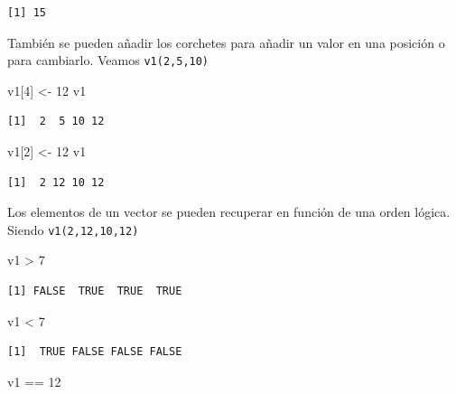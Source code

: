 \documentclass[
  letterpaper,
  DIV=11,
  numbers=noendperiod]{scrreprt}
\newenvironment{Shaded}{\begin{snugshade}}{\end{snugshade}}
\newcommand{\DecValTok}[1]{\textcolor[rgb]{0.68,0.00,0.00}{#1}}
\newcommand{\NormalTok}[1]{\textcolor[rgb]{0.00,0.23,0.31}{#1}}
\newcommand{\OtherTok}[1]{\textcolor[rgb]{0.00,0.23,0.31}{#1}}
\newcommand{\SpecialCharTok}[1]{\textcolor[rgb]{0.37,0.37,0.37}{#1}}
\begin{document}
\begin{verbatim}
[1] 15
\end{verbatim}

También se pueden añadir los corchetes para añadir un valor en una
posición o para cambiarlo. Veamos \texttt{v1(2,5,10)}

\begin{Shaded}
\begin{Highlighting}[]
\NormalTok{v1[}\DecValTok{4}\NormalTok{] }\OtherTok{\textless{}{-}} \DecValTok{12}
\NormalTok{v1}
\end{Highlighting}
\end{Shaded}

\begin{verbatim}
[1]  2  5 10 12
\end{verbatim}

\begin{Shaded}
\begin{Highlighting}[]
\NormalTok{v1[}\DecValTok{2}\NormalTok{] }\OtherTok{\textless{}{-}} \DecValTok{12}
\NormalTok{v1}
\end{Highlighting}
\end{Shaded}

\begin{verbatim}
[1]  2 12 10 12
\end{verbatim}

Los elementos de un vector se pueden recuperar en función de una orden
lógica. Siendo \texttt{v1(2,12,10,12)}

\begin{Shaded}
\begin{Highlighting}[]
\NormalTok{v1 }\SpecialCharTok{\textgreater{}} \DecValTok{7}
\end{Highlighting}
\end{Shaded}

\begin{verbatim}
[1] FALSE  TRUE  TRUE  TRUE
\end{verbatim}

\begin{Shaded}
\begin{Highlighting}[]
\NormalTok{v1 }\SpecialCharTok{\textless{}} \DecValTok{7}
\end{Highlighting}
\end{Shaded}

\begin{verbatim}
[1]  TRUE FALSE FALSE FALSE
\end{verbatim}

\begin{Shaded}
\begin{Highlighting}[]
\NormalTok{v1 }\SpecialCharTok{==} \DecValTok{12}
\end{Highlighting}
\end{Shaded}
\end{document}
